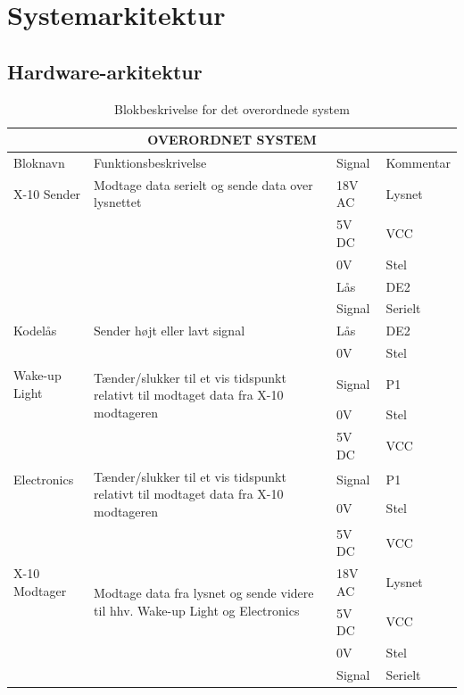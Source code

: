 \documentclass[11pt]{article}
\begin{document}
\section{Systemarkitektur}
\subsection{Hardware-arkitektur}
\begin{table}[!ht]
\centering
	\begin{tabular}{l|p{10cm}|l|l}
	
	\toprule[0.4mm]\midrule \multicolumn{4}{c}{\textbf{OVERORDNET SYSTEM}}\\
	\midrule[0.4mm] Bloknavn & Funktionsbeskrivelse & Signal & Kommentar\\ \midrule[0.3mm]
	X-10 Sender & Modtage data serielt og sende data over lysnettet & 18V AC & Lysnet\\
	 & & 5V DC & VCC\\
	 & & 0V & Stel\\
	 & & Lås & DE2\\
	 & & Signal & Serielt\\
	 \midrule
	 Kodelås & Sender højt eller lavt signal & Lås & DE2\\
	 & & 0V & Stel\\
	 \midrule
	 Wake-up Light & \multirow{2}{10cm}{Tænder/slukker til et vis tidspunkt relativt til modtaget data fra X-10 modtageren \vfill}  & Signal & P1\\
	 & & 0V & Stel\\
	 & & 5V DC & VCC\\
	 \midrule
	 Electronics & \multirow{2}{10cm}{Tænder/slukker til et vis tidspunkt relativt til modtaget data fra X-10 modtageren \vfill}  & Signal & P1\\
	 & & 0V & Stel\\
	 & & 5V DC & VCC\\
	 \midrule
	 X-10 Modtager & \multirow{2}{10cm}{Modtage data fra lysnet og sende videre til hhv. Wake-up Light og Electronics \vfill} & 18V AC & Lysnet\\
	 & & 5V DC & VCC\\
	 & & 0V & Stel\\
	 & & Signal & Serielt\\
	 \midrule\bottomrule[0.4mm]

	\end{tabular}
	\caption{Blokbeskrivelse for det overordnede system}
	\label{tab: Bloktabel}
\end{table}
\end{document}

